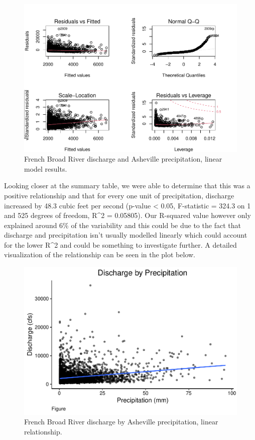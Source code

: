 \documentclass[
]{article}
\begin{document}
\begin{figure}

{\centering \includegraphics{SD_AD_NVT_EDAfinal_files/figure-latex/unnamed-chunk-14-1} 

}

\caption{French Broad River discharge and Asheville precipitation, linear model results.}\label{fig:unnamed-chunk-14}
\end{figure}

Looking closer at the summary table, we were able to determine that this
was a positive relationship and that for every one unit of
precipitation, discharge increased by 48.3 cubic feet per second
(p-value \textless{} 0.05, F-statistic = 324.3 on 1 and 525 degrees of
freedom, R\^{}2 = 0.05805). Our R-squared value however only explained
around 6\% of the variability and this could be due to the fact that
discharge and precipitation isn't usually modelled linearly which could
account for the lower R\^{}2 and could be something to investigate
further. A detailed visualization of the relationship can be seen in the
plot below.

\begin{figure}
\centering
\includegraphics{SD_AD_NVT_EDAfinal_files/figure-latex/unnamed-chunk-15-1.pdf}
\caption{French Broad River discharge by Asheville precipitation, linear
relationship.}
\end{figure}
\end{document}
